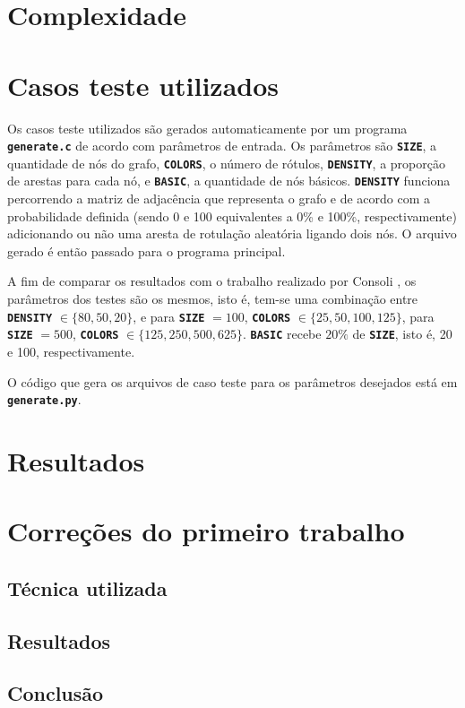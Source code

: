 \documentclass[12pt, a4paper]{article}
\newcommand{\ic}[1]{\textbf{\lstinline{#1}}}
\begin{document}
\section{Complexidade}

\section{Casos teste utilizados}
Os casos teste utilizados são gerados automaticamente por um programa
\ic{generate.c} de acordo com parâmetros de entrada. Os parâmetros são
\ic{SIZE}, a quantidade de nós do grafo, \ic{COLORS}, o número de rótulos,
\ic{DENSITY}, a proporção de arestas para cada nó, e \ic{BASIC}, a quantidade
de nós básicos. \ic{DENSITY} funciona percorrendo a matriz de adjacência que
representa o grafo e de acordo com a probabilidade definida (sendo 0 e 100
equivalentes a 0\% e 100\%, respectivamente) adicionando ou não uma aresta de
rotulação aleatória ligando dois nós. O arquivo gerado é então passado para o
programa principal.

A fim de comparar os resultados com o trabalho realizado por Consoli
\cite{consoli}, os parâmetros dos testes são os mesmos, isto é, tem-se uma
combinação entre \ic{DENSITY} $ \in \{80, 50, 20\} $, e para \ic{SIZE} $ = 100 $,
\ic{COLORS} $ \in \{25, 50, 100, 125\} $, para \ic{SIZE} $ = 500 $, \ic{COLORS}
$ \in \{125, 250, 500, 625\} $. \ic{BASIC} recebe $ 20\% $ de \ic{SIZE}, isto é,
20 e 100, respectivamente.

O código que gera os arquivos de caso teste para os parâmetros desejados está
em \ic{generate.py}.

\section{Resultados}

\section{Correções do primeiro trabalho}
\subsection{Técnica utilizada}
\subsection{Resultados}
\subsection{Conclusão}
\end{document}

